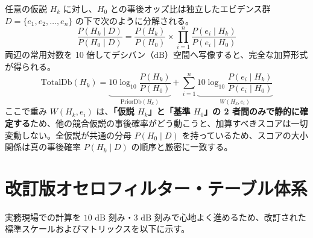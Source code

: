 任意の仮説 $H_k$ に対し、$H_0$ との事後オッズ比は独立したエビデンス群 $D = \{e_1, e_2, \dots, e_n\}$ の下で次のように分解される。
\begin{equation}
\frac{P(H_k \mid D)}{P(H_0 \mid D)} = \frac{P(H_k)}{P(H_0)} \times \prod_{i=1}^{n} \frac{P(e_i \mid H_k)}{P(e_i \mid H_0)}
\end{equation}
両辺の常用対数を 10 倍してデシバン（$\text{dB}$）空間へ写像すると、完全な加算形式が得られる。
\begin{equation}
\text{TotalDb}(H_k) = \underbrace{10 \log_{10} \frac{P(H_k)}{P(H_0)}}_{\text{PriorDb}(H_k)} + \sum_{i=1}^{n} \underbrace{10 \log_{10} \frac{P(e_i \mid H_k)}{P(e_i \mid H_0)}}_{W(H_k, e_i)}
\end{equation}
ここで重み $W(H_k, e_i)$ は、\textbf{「仮説 $H_k$」と「基準 $H_0$」の 2 者間のみで静的に確定する}ため、他の競合仮説の事後確率がどう動こうと、加算すべきスコアは一切変動しない。全仮説が共通の分母 $P(H_0 \mid D)$ を持っているため、スコアの大小関係は真の事後確率 $P(H_k \mid D)$ の順序と厳密に一致する。

\section{改訂版オセロフィルター・テーブル体系}

実務現場での計算を $10\text{ dB}$ 刻み・$3\text{ dB}$ 刻みで心地よく進めるため、改訂された標準スケールおよびマトリックスを以下に示す。

